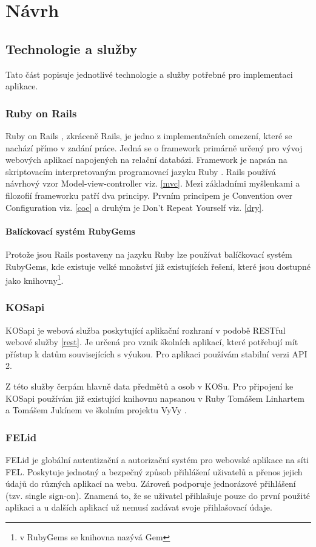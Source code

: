 \chapter{Návrh}

\section{Technologie a služby}
Tato část popisuje jednotlivé technologie a služby potřebné pro implementaci aplikace.

\subsection{Ruby on Rails}
Ruby on Rails \cite{rubyonrails}, zkráceně Rails, je jedno z implementačních omezení, které se nachází přímo v zadání práce. Jedná se o framework primárně určený pro vývoj webových aplikací napojených na relační databázi. Framework je napsán na skriptovacím interpretovaným programovací jazyku Ruby \cite{ruby}. Rails používá návrhový vzor Model-view-controller viz. \ref{mvc}. Mezi základními myšlenkami a filozofií frameworku patří dva principy. Prvním principem je Convention over Configuration viz. \ref{coc} a druhým je Don’t Repeat Yourself viz. \ref{dry}.

\subsubsection{Balíckovací systém RubyGems}
Protože jsou Rails postaveny na jazyku Ruby lze používat balíčkovací systém RubyGems, kde existuje velké množství již existujících řešení, které jsou dostupné jako knihovny\footnote{v RubyGems se knihovna nazývá Gem}. 

\subsection{KOSapi}
\label{kosapi}
KOSapi je webová služba poskytující aplikační rozhraní v podobě RESTful webové služby \ref{rest}. Je určená pro vznik školních aplikací, které potřebují mít přístup k datům souvisejících s výukou. Pro aplikaci používám stabilní verzi API 2. 

Z této služby čerpám hlavně data předmětů a osob v KOSu. Pro připojení ke KOSapi používám již existující knihovnu napsanou v Ruby Tomášem Linhartem a Tomášem Jukínem ve školním projektu VyVy \cite{vyvy_project}.  

\subsection{FELid}
\label{felid}
FELid \cite{felid} je globální autentizační a autorizační systém pro webovské aplikace na síti FEL. Poskytuje jednotný a bezpečný způsob přihlášení uživatelů a přenos jejich údajů do různých aplikací na webu. Zároveň podporuje jednorázové přihlášení (tzv. single sign-on). Znamená to, že se uživatel přihlašuje pouze do první použité aplikaci a u dalších aplikací už nemusí zadávat svoje přihlašovací údaje.

